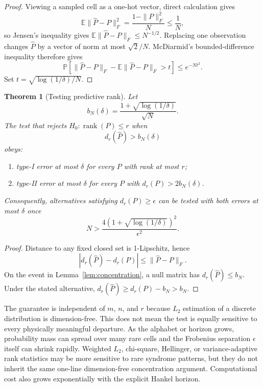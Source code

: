 \documentclass[11pt]{article}
\newtheorem{theorem}{Theorem}
\newcommand{\Prob}{\mathbb{P}}
\newcommand{\E}{\mathbb{E}}
\newcommand{\rank}{\operatorname{rank}}
\begin{document}
\begin{proof}
Viewing a sampled cell as a one-hot vector, direct calculation gives
\[
    \E\|\widehat P-P\|_F^2
    =\frac{1-\|P\|_F^2}{N}\le\frac1N,
\]
so Jensen's inequality gives $\E\|\widehat P-P\|_F\le N^{-1/2}$. Replacing one observation changes $\widehat P$ by a vector of norm at most $\sqrt2/N$. McDiarmid's bounded-difference inequality \cite{mcdiarmid1989bounded} therefore gives
\[
\Prob\!\left[
\|\widehat P-P\|_F-\E\|\widehat P-P\|_F>t
\right]\le e^{-Nt^2}.
\]
Set $t=\sqrt{\log(1/\delta)/N}$.
\end{proof}

\begin{theorem}[Testing predictive rank]
\label{thm:upper}
Let
\[
    b_N(\delta)=\frac{1+\sqrt{\log(1/\delta)}}{\sqrt N}.
\]
The test that rejects $H_0:\rank(P)\le r$ when
\begin{equation}
    d_r(\widehat P)>b_N(\delta)
    \label{eq:test}
\end{equation}
obeys:
\begin{enumerate}[label=(\roman*)]
    \item type-I error at most $\delta$ for every $P$ with rank at most $r$;
    \item type-II error at most $\delta$ for every $P$ with $d_r(P)>2b_N(\delta)$.
\end{enumerate}
Consequently, alternatives satisfying $d_r(P)\ge\epsilon$ can be tested with both errors at most $\delta$ once
\begin{equation}
    N>\frac{4(1+\sqrt{\log(1/\delta)})^2}{\epsilon^2}.
\end{equation}
\end{theorem}

\begin{proof}
Distance to any fixed closed set is 1-Lipschitz, hence
\[
    |d_r(\widehat P)-d_r(P)|\le\|\widehat P-P\|_F.
\]
On the event in Lemma~\ref{lem:concentration}, a null matrix has $d_r(\widehat P)\le b_N$. Under the stated alternative,
$d_r(\widehat P)\ge d_r(P)-b_N>b_N$.
\end{proof}

The guarantee is independent of $m$, $n$, and $r$ because $L_2$ estimation of a discrete distribution is dimension-free. This does not mean the test is equally sensitive to every physically meaningful departure. As the alphabet or horizon grows, probability mass can spread over many rare cells and the Frobenius separation $\epsilon$ itself can shrink rapidly. Weighted $L_2$, chi-square, Hellinger, or variance-adaptive rank statistics may be more sensitive to rare syndrome patterns, but they do not inherit the same one-line dimension-free concentration argument. Computational cost also grows exponentially with the explicit Hankel horizon.
\end{document}
